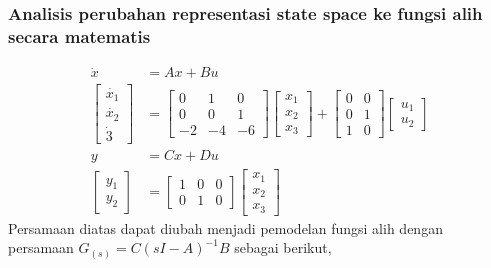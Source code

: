 \documentclass[../main.tex]{subfiles}
\begin{document}
            \subsubsection{Analisis perubahan representasi state space ke fungsi alih secara matematis}
                \begin{equation}
                    \begin{split}
                        \dot{x} &= Ax + Bu \\[5pt]
                        \begin{bmatrix} \dot{x_1} \\ \dot{x_2} \\ \dot{3} \end{bmatrix} &= \begin{bmatrix} 0 & 1 & 0 \\ 0 & 0 & 1 \\ -2 & -4 & -6 \end{bmatrix} \begin{bmatrix} x_1 \\ x_2 \\ x_3  \end{bmatrix} + \begin{bmatrix} 0 & 0 \\ 0 & 1 \\ 1 & 0 \end{bmatrix} \begin{bmatrix} u_1 \\ u_2 \end{bmatrix} \\[10pt]
                        y &= Cx + Du \\[5pt]
                        \begin{bmatrix} y_1 \\ y_2 \end{bmatrix} &= \begin{bmatrix} 1 & 0 & 0 \\ 0 & 1 & 0 \end{bmatrix} \begin{bmatrix} x_1 \\ x_2 \\ x_3 \end{bmatrix}
                    \end{split}
                \end{equation}
                Persamaan diatas dapat diubah menjadi pemodelan fungsi alih dengan persamaan $G_{(s)} = C(sI - A)^{-1} B$ sebagai berikut,
\end{document}
